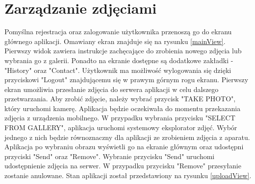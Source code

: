 \section{Zarządzanie zdjęciami}{

Pomyślna rejestracja oraz zalogowanie użytkownika przenoszą go do ekranu głównego aplikacji. Omawiany ekran znajduje się na rysunku \ref{mainView}. Pierwszy widok zawiera instrukcje zachęcające do zrobienia nowego zdjęcia lub wybrania go z galerii. Ponadto na ekranie dostępne są dodatkowe zakładki - "History" oraz "Contact". Użytkownik ma możliwość wylogowania się dzięki przyciskowi "Logout" znajdującemu się w prawym górnym rogu ekranu. Pierwszy ekran umożliwia przesłanie zdjęcia do serwera aplikacji w celu dalszego przetwarzania. Aby zrobić zdjęcie, należy wybrać przycisk "TAKE PHOTO", który uruchomi kamerę. Aplikacja będzie oczekiwała do momentu przekazania zdjęcia z urządzenia mobilnego. W przypadku wybrania przycisku "SELECT FROM GALLERY", aplikacja uruchomi systemowy eksplorator zdjęć. Wybór jednego z nich będzie równoznaczny dla aplikacji ze zrobieniem zdjęcia z aparatu. Aplikacja po wybraniu obrazu wyświetli go na ekranie głównym oraz udostępni przyciski "Send" oraz "Remove". Wybranie przycisku "Send" uruchomi udostępnienie zdjęcia na serwer. W przypadku przycisku "Remove" przesyłanie zostanie anulowane. Stan aplikacji został przedstawiony na rysunku \ref{uploadView}.

}
